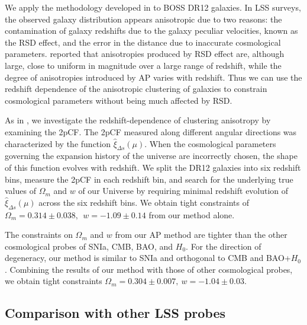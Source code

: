 \documentclass[iop]{emulateapj}
\begin{document}
We apply the methodology developed in \cite{Li2014,Li2015} to BOSS DR12 galaxies.
In LSS surveys, the observed galaxy distribution appears anisotropic due to two reasons:
the contamination of galaxy redshifts due to the galaxy peculiar velocities, known as the RSD effect, 
and the error in the distance due to inaccurate cosmological parameters. %
\cite{Li2014} reported that anisotropies produced by RSD effect are, although large,
close to uniform in magnitude over a large range of redshift,
while the degree of anisotropies introduced by AP varies with redshift. 
Thus we can use the redshift dependence of the anisotropic clustering of galaxies to constrain cosmological parameters without 
being much affected by RSD.

As in \cite{Li2015}, we investigate the redshift-dependence of clustering anisotropy by examining the 2pCF.
The 2pCF measured along different angular directions was characterized by the function $\hat \xi_{\Delta s}(\mu)$.
When the cosmological parameters governing the expansion history of the universe are incorrectly chosen,
the shape of this function evolves with redshift.
We split the DR12 galaxies into six redshift bins, measure the 2pCF in each redshift bin,
and search for the underlying true values of $\Omega_m$ and $w$ of our Universe %
by requiring minimal redshift evolution of $\hat \xi_{\Delta s}(\mu)$ across the six redshift bins.
We obtain tight constraints of $\Omega_m=0.314 \pm 0.038,\ \ w = -1.09 \pm 0.14$ from our method alone.

The constraints on $\Omega_m$ and $w$ from our AP method are tighter %
than the other cosmological probes of SNIa, CMB, BAO, and $H_0$.
For the direction of degeneracy, %
our method is similar to SNIa and orthogonal to CMB and BAO+$H_0$.
Combining the results of our method with those of other cosmological probes, 
we obtain tight constraints $ \Omega_m = 0.304 \pm 0.007,\ w=-1.04 \pm 0.03$.


\subsection{Comparison with other LSS probes}
\end{document}
